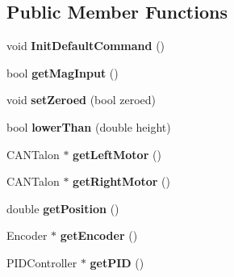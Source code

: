 \subsection*{Public Member Functions}
\begin{DoxyCompactItemize}
\item 
\hypertarget{class_tote_lifterino_a972bde0b7cb90474cf63fadad3a9297c}{}void {\bfseries Init\+Default\+Command} ()\label{class_tote_lifterino_a972bde0b7cb90474cf63fadad3a9297c}

\item 
\hypertarget{class_tote_lifterino_a7f0063d9a14e6a9413e7b38847854962}{}bool {\bfseries get\+Mag\+Input} ()\label{class_tote_lifterino_a7f0063d9a14e6a9413e7b38847854962}

\item 
\hypertarget{class_tote_lifterino_a039877dfaec2b0bc1c722ac852674b78}{}void {\bfseries set\+Zeroed} (bool zeroed)\label{class_tote_lifterino_a039877dfaec2b0bc1c722ac852674b78}

\item 
\hypertarget{class_tote_lifterino_a3a5cbfd809e851a8cbd5202ea0565626}{}bool {\bfseries lower\+Than} (double height)\label{class_tote_lifterino_a3a5cbfd809e851a8cbd5202ea0565626}

\item 
\hypertarget{class_tote_lifterino_a853d0d90d50406b572d1518719e4f866}{}C\+A\+N\+Talon $\ast$ {\bfseries get\+Left\+Motor} ()\label{class_tote_lifterino_a853d0d90d50406b572d1518719e4f866}

\item 
\hypertarget{class_tote_lifterino_abda31d2e071bd526afd95a35d7dc0f14}{}C\+A\+N\+Talon $\ast$ {\bfseries get\+Right\+Motor} ()\label{class_tote_lifterino_abda31d2e071bd526afd95a35d7dc0f14}

\item 
\hypertarget{class_tote_lifterino_a2bf754226a84928655ad00a1fa5dc7a6}{}double {\bfseries get\+Position} ()\label{class_tote_lifterino_a2bf754226a84928655ad00a1fa5dc7a6}

\item 
\hypertarget{class_tote_lifterino_a2e7f3a02eebaddca1805c282715a6659}{}Encoder $\ast$ {\bfseries get\+Encoder} ()\label{class_tote_lifterino_a2e7f3a02eebaddca1805c282715a6659}

\item 
\hypertarget{class_tote_lifterino_af6781e4b7e6a9a5e1f7f8e68ff84500c}{}P\+I\+D\+Controller $\ast$ {\bfseries get\+P\+I\+D} ()\label{class_tote_lifterino_af6781e4b7e6a9a5e1f7f8e68ff84500c}


\end{DoxyCompactItemize}
